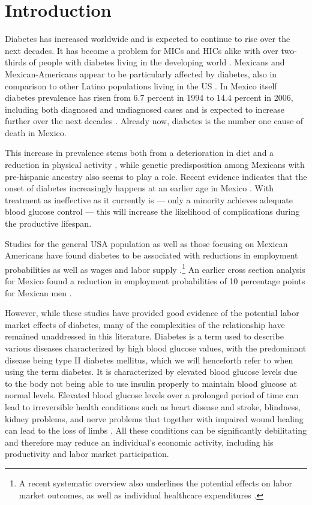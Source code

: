 \documentclass[12pt,english,british]{article}
\begin{document}
\section{\label{sec:Introduction}Introduction }

Diabetes has increased worldwide and is expected to continue to rise over the next decades. It has become a problem for \ac{MICs} and \ac{HICs} alike with over two-thirds of people with diabetes living in the developing world \citep{InternationalDiabetesFederation2013}. Mexicans and Mexican-Americans appear to be particularly affected by diabetes, also in comparison to other Latino populations living in the \ac{US} \citep{Schneiderman2014}. In Mexico itself diabetes prevalence has risen from 6.7 percent in 1994 to 14.4 percent in 2006, including both diagnosed and undiagnosed cases \citep{Barquera2013} and is expected to increase further over the next decades \citep{Meza2015}. Already now, diabetes is the number one cause of death in Mexico. 

This increase in prevalence stems both from a deterioration in diet and a reduction in physical activity \citep{Barquera2008b,Basu2013}, while genetic predisposition among Mexicans with pre-hispanic ancestry also seems to play a role\citep{Williams2013}. Recent evidence indicates that the onset of diabetes increasingly happens at an earlier age in Mexico \citep{Villalpando2010}. With treatment as ineffective as it currently is --- only a minority achieves adequate blood glucose control  \citep{Barquera2013} --- this will increase the likelihood of complications during the productive lifespan. 

Studies for the general \ac{USA} population as well as those focusing on Mexican Americans have found diabetes to be associated with reductions in employment probabilities as well as wages and labor supply \citep{Brown2005,Brown2014,BrownIII2011,Minor2010,Minor2013}.\footnote{ A recent systematic overview also underlines the potential effects on labor market outcomes, as well as individual healthcare expenditures \citep{Seuring2015a}.}
 An earlier cross section analysis for Mexico found a reduction in employment probabilities of 10 percentage points for Mexican men \citep{Seuring2015}. 

However, while these studies have provided good evidence of the potential labor market effects of diabetes, many of the complexities of the relationship have remained unaddressed in this literature. Diabetes is a term used to describe  various diseases characterized by high blood glucose values, with the predominant disease being type II diabetes mellitus, which we will henceforth refer to when using the term diabetes. It is characterized by elevated blood glucose levels due to the body not being able to use insulin properly to maintain blood glucose at normal levels. Elevated blood glucose levels over a prolonged period of time can lead to irreversible health conditions such as heart disease and stroke, blindness, kidney problems, and nerve problems that together with impaired wound healing can lead to the loss of limbs \citep{Reynoso-Noveron2011}. All these conditions can be significantly debilitating and therefore may reduce an individual's economic activity, including his productivity and labor market participation. 
\end{document}
